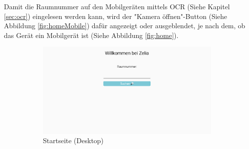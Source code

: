 Damit die Raumnummer auf den Mobilgeräten mittels OCR (Siehe Kapitel \ref{sec:ocr}) eingelesen werden kann, wird der "Kamera öffnen"-Button (Siehe Abbildung \ref{fig:homeMobile}) dafür angezeigt oder ausgeblendet, je nach dem, ob das Gerät ein Mobilgerät ist (Siehe Abbildung \ref{fig:home}).

\begin{figure}[H]
    \begin{subfigure}[c]{0.65\textwidth}
        \centering
        \includegraphics[width=\textwidth]{media/ResponsiveDesign/ZeliaHome.png}
        \caption{Startseite (Desktop)}
    \end{subfigure} \hfill
    \begin{subfigure}[c]{0.35\textwidth}
        \centering

\end{subfigure}
\end{figure}
